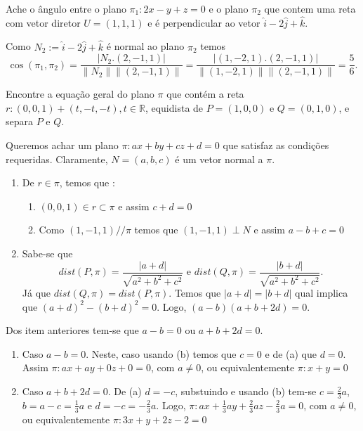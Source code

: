 \documentclass[11pt]{exam}
\begin{document}
 \begin{questions}
 \question[20] Ache o ângulo entre o plano 
 $\pi_1: 2x-y+z=0$ e o plano $\pi_2$ que contem
 uma reta com vetor diretor $U=(1,1,1)$
 e é perpendicular ao vetor  $\hat{i}-2\hat{j}+\hat{k}$.
   \begin{solution}
   Como  $N_2:=\hat{i}-2\hat{j}+\hat{k}$ é normal ao plano $\pi_2$
   temos 
   $$
     \cos(\pi_1,\pi_2)=
     \frac{|N_{2}.(2,-1,1)|}{\|N_2\|\|(2,-1,1)\|}=
     \frac{|(1,-2,1).(2,-1,1)|}{\|(1,-2,1)\|\|(2,-1,1)\|}=
     \frac{5}{6}.
   $$ 
   \end{solution}
 \question[20] Encontre a equação geral do plano
 $\pi$ que contém a
  reta $r: (0,0,1)+(t,-t,-t), t \in \mathbb{R}$, 
  equidista de $P=(1,0,0)$ e $Q=(0,1,0)$, 
  e separa $P$ e $Q$.
   \begin{solution}
   Queremos achar um plano $\pi: ax+by+cz+d=0$ que satisfaz as condições
   requeridas. Claramente, $N=(a,b,c)$ é um vetor normal a $\pi$.
     \begin{enumerate}
     \item De $r \in \pi$, temos que :
       \begin{enumerate}
       \item $(0,0,1) \in r \subset \pi$ e assim $c+d=0$
       \item Como $(1,-1,1) // \pi$ temos que 
       $(1,-1,1)\perp N$ e assim $a-b+c=0$
       \end{enumerate}
     \item Sabe-se que 
     $$
       dist(P,\pi)=\frac{|a+d|}{\sqrt{a^{2}+b^2+c^2}} \text{ e }
       dist(Q,\pi)=\frac{|b+d|}{\sqrt{a^{2}+b^2+c^2}}.
     $$ 
     Já que 
     $dist(Q,\pi)=dist(P,\pi)$. Temos que $|a+d|=|b+d|$ qual implica que 
     $(a+d)^{2}-(b+d)^2=0$. Logo, $(a-b)(a+b+2d)=0$.
     \end{enumerate}
   Dos item anteriores tem-se que $a-b=0$ ou $a+b+2d=0$.
     \begin{enumerate}
     \item Caso $a-b=0$. Neste, caso usando (b) 
     temos que $c=0$ e de (a) que $d=0$. 
     Assim $\pi: ax+ay+0z+0=0$, com $a\neq0$, ou equivalentemente 
      $\pi: x+y=0$
      \item Caso $a+b+2d=0$. De (a) $d=-c$, substuindo e usando (b) tem-se 
      $c=\frac{2}{3}a$, $b=a-c=\frac{1}{3}a$ e $d=-c=-\frac{2}{3}a$.
      Logo, $\pi: ax+\frac{1}{3}ay+\frac{2}{3}az-\frac{2}{3}a=0$, com $a\neq0$, ou equivalentemente 
       $\pi: 3x+y+2z-2=0$
     \end{enumerate}       

\end{solution}
\end{questions}
\end{document}
